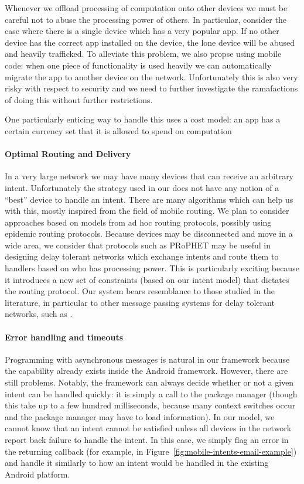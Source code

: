 \documentclass{acm_proc_article-sp}
\begin{document}
Whenever we offload processing of computation onto other devices we
must be careful not to abuse the processing power of others.  In
particular, consider the case where there is a single device which has
a very popular app.  If no other device has the correct app installed
on the device, the lone device will be abused and heavily trafficked.
To alleviate this problem, we also propse using mobile code: when one
piece of functionality is used heavily we can automatically migrate
the app to another device on the network.  Unfortunately this is also
very risky with respect to security and we need to further investigate
the ramafactions of doing this without further restrictions.

One particularly enticing way to handle this uses a cost model: an app
has a certain currency set that it is allowed to spend on computation

\paragraph{Optimal Routing and Delivery}

In a very large network we may have many devices that can receive an
arbitrary intent.  Unfortunately the strategy used in our does not
have any notion of a ``best'' device to handle an intent.  There are
many algorithms which can help us with this, mostly inspired from the
field of mobile routing.  We plan to consider approaches based on
models from ad hoc routing protocols, possibly using epidemic routing
protocols.  Because devices may be disconnected and move in a wide
area, we consider that protocols such as PRoPHET \cite{prophet:2003}
may be useful in designing delay tolerant networks which exchange
intents and route them to handlers based on who has processing power.
This is particularly exciting because it introduces a new set of
constraints (based on our intent model) that dictates the routing
protocol.  Our system bears resemblance to those studied in the
literature, in particular to other message passing systems for delay
tolerant networks, such as \cite{message-passing-dtn}.

\paragraph{Error handling and timeouts} 

Programming with asynchronous messages is natural in our framework
because the capability already exists inside the Android framework.
However, there are still problems.  Notably, the framework can always
decide whether or not a given intent can be handled quickly: it is
simply a call to the package manager (though this take up to a few
hundred milliseconds, because many context switches occur and the
package manager may have to load information).  In our model, we
cannot know that an intent cannot be satisfied unless all devices in
the network report back failure to handle the intent.  In this case,
we simply flag an error in the returning callback (for example, in
Figure~\ref{fig:mobile-intents-email-example}) and handle it similarly
to how an intent would be handled in the existing Android platform.
\end{document}
